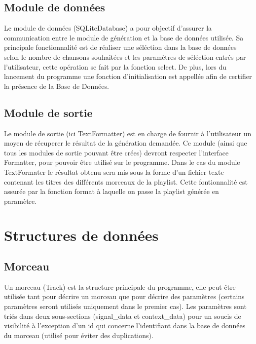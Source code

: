 \subsection{Module de données}
\label{archi:modules:donnees}

Le module de données (SQLiteDatabase) a pour objectif d'assurer la communication 
entre le module de génération et la base de données utilisée. Sa principale 
fonctionnalité est de réaliser une séléction dans la base de données selon le 
nombre de chansons souhaitées et les paramètres de séléction entrés par 
l'utilisateur, cette opération se fait par la fonction select.
De plus, lors du lancement du programme une fonction d'initialisation est 
appellée afin de certifier la présence de la Base de Données.

\subsection{Module de sortie}
\label{archi:modules:sortie}

Le module de sortie (ici TextFormatter) est en charge de fournir à 
l'utilisateur un moyen de récuperer le résultat de la génération demandée. Ce 
module (ainsi que tous les modules de sortie pouvant être crées) devront 
respecter l'interface Formatter, pour pouvoir être utilisé sur le programme. 
Dans le cas du module TextFormater le résultat obtenu sera mis sous la forme 
d'un fichier texte contenant les titres des différents morceaux de la playlist. 
Cette fontionnalité est assurée par la fonction format à laquelle on passe la 
playlist générée en paramètre.

\section{Structures de données}
\label{archi:structures}

\subsection{Morceau}
\label{archi:structures:morceau}

Un morceau (Track) est la structure principale du programme, elle peut être 
utilisée tant pour décrire un morceau que pour décrire des paramètres 
(certains paramètres seront utilisés uniquement dans le premier cas). Les 
paramètres sont triés dans deux sous-sections (signal\_data et context\_data) 
pour un soucis de visibilité à l'exception d'un id qui concerne l'identifiant 
dans la base de données du morceau (utilisé pour éviter des duplications).

